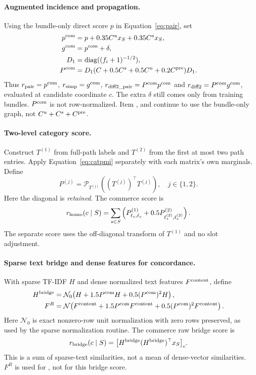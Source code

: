 \documentclass[11pt,a4paper]{article}
\newcommand{\rn}{\mathcal N}
\DeclareRobustCommand{\key}[1]{\texttt{\detokenize{#1}}}
\begin{document}
\paragraph{Augmented incidence and propagation.}
Using the bundle-only direct score $p$ in Equation~\eqref{eq:pair}, set
\begin{align}
 p^{\rm com}&=p+0.35C^ux_S+0.35C^sx_S,\\
 g^{\rm com}&=p^{\rm com}+\delta,\\
 D_1&=\operatorname{diag}((f_i+1)^{-1/2}),\\
 P^{\rm com}&=D_1(C+0.5C^s+0.5C^u+0.2C^{\rm pre})D_1.
\end{align}
Thus $r_{\rm pair}=p^{\rm com}$, $r_{\rm simp}=g^{\rm com}$,
$r_{\rm diff2\_pair}=P^{\rm com}p^{\rm com}$ and
$r_{\rm diff2}=P^{\rm com}g^{\rm com}$, evaluated at candidate coordinate $c$.
The extra $\delta$ still comes only from training bundles. $P^{\rm com}$ is
not row-normalized. Item \key{cooc}, \key{ppmi} and \key{csvd} continue to use
the bundle-only graph, not $C^u+C^s+C^{\rm pre}$.

\paragraph{Two-level category score.}
Construct $T^{(1)}$ from full-path labels and $T^{(2)}$ from the first at most
two path entries. Apply Equation~\eqref{eq:catpmi} separately with each
matrix's own marginals. Define
\[
 P^{(j)}=\mathcal P_{T^{(j)}}((T^{(j)})^\top T^{(j)}),\quad j\in\{1,2\}.
\]
Here the diagonal is \emph{retained}. The commerce \key{homo} score is
\begin{equation}
 r_{\rm homo}(c\mid S)=\sum_{s\in S}
 \left(P^{(1)}_{\ell_s,\ell_c}
 +0.5P^{(2)}_{\ell_s^{(2)},\ell_c^{(2)}}\right).
\end{equation}
The separate \key{cat} score uses the off-diagonal transform of $T^{(1)}$
and no slot adjustment.

\paragraph{Sparse text bridge and dense features for concordance.}
With sparse TF-IDF $H$ and dense normalized text features $F^{\rm content}$,
define
\begin{align}
 H^{\rm bridge}&=\rn_0\!\left(H+1.5P^{\rm com}H
                          +0.5(P^{\rm com})^2H\right),\\
 F^{R}&=\rn\!\left(F^{\rm content}+1.5P^{\rm com}F^{\rm content}
                          +0.5(P^{\rm com})^2F^{\rm content}\right).
\end{align}
Here $\rn_0$ is exact nonzero-row unit normalization with zero rows preserved,
as used by the sparse normalization routine. The commerce raw bridge score is
\begin{equation}
 r_{\rm bridge}(c\mid S)=
 \bigl[H^{\rm bridge}(H^{\rm bridge})^\top x_S\bigr]_c.
\end{equation}
This is a sum of sparse-text similarities, not a mean of dense-vector
similarities. $F^R$ is used for \key{rao}, not for this bridge score.
\end{document}
